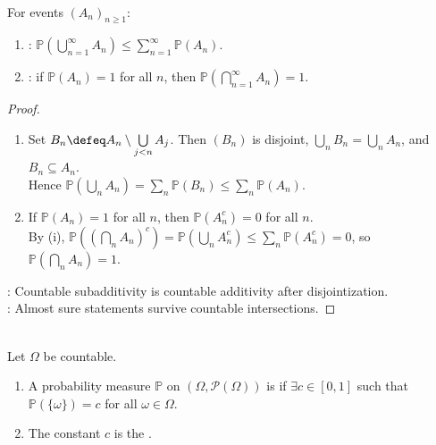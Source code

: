 \begin{proposition} \label{prop:union-bound-and-full-probability-intersections} \\
For events $(A_n)_{n\geq1}$:
\begin{enumerate}[label=(\roman*)]
\setlength{\itemsep}{0pt}
\item {}: $\mathbb{P}(\bigcup\limits_{n=1}^{\infty}A_n)\leq\sum\limits_{n=1}^{\infty}\mathbb{P}(A_n)$.
\item {}: if $\mathbb{P}(A_n)=1$ for all $n$, then $\mathbb{P}(\bigcap\limits_{n=1}^{\infty}A_n)=1$.
\end{enumerate}
\begin{proof}
\begin{enumerate}[label=(\roman*)]
\setlength{\itemsep}{0pt}
\item Set $B_n\defeq A_n\setminus\bigcup\limits_{j<n}A_j$. Then $(B_n)$ is disjoint, $\bigcup\limits_nB_n=\bigcup\limits_nA_n$, and $B_n\subseteq A_n$.\\
Hence $\mathbb{P}(\bigcup\limits_nA_n)=\sum\limits_n\mathbb{P}(B_n)\leq\sum\limits_n\mathbb{P}(A_n)$.
\item If $\mathbb{P}(A_n)=1$ for all $n$, then $\mathbb{P}(A_n^c)=0$ for all $n$.\\
By (i), $\mathbb{P}((\bigcap\limits_nA_n)^c)=\mathbb{P}(\bigcup\limits_nA_n^c)\leq\sum\limits_n\mathbb{P}(A_n^c)=0$, so $\mathbb{P}(\bigcap\limits_nA_n)=1$.
\end{enumerate}
: Countable subadditivity is countable additivity after disjointization.\\
: Almost sure statements survive countable intersections.
\end{proof}
\end{proposition}

\begin{definition} \label{def:uniform-probability-countable-space} \\
Let $\Omega$ be countable.
\begin{enumerate}[label=(\roman*)]
\setlength{\itemsep}{0pt}
\item A probability measure $\mathbb{P}$ on $(\Omega,\mathcal{P}(\Omega))$ is  if $\exists c\in[0,1]$ such that $\mathbb{P}(\{\omega\})=c$ for all $\omega\in\Omega$.
\item The constant $c$ is the .
\end{enumerate}
\end{definition}


